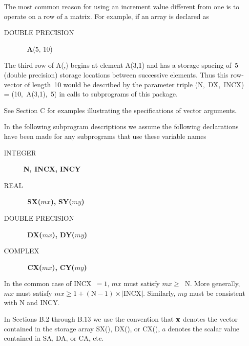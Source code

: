 \documentclass[twoside]{MATH77}
\begin{document}
The most common reason for using an increment value different from one is to
operate on a row of a matrix. For example, if an array is declared as
\begin{description}
\item[DOUBLE PRECISION]  \ {\bf A}(5, 10)
\end{description}
The third row of A(,) begins at element A(3,1) and has a storage spacing of~5
(double precision) storage locations between successive elements. Thus this
row-vector of length~10 would be described by the parameter triple
(N,~DX,~INCX) = (10,~A(3,1),~5) in calls to subprograms of this package.

See Section C for examples illustrating the specifications of vector
arguments.

In the following subprogram descriptions we assume the following
declarations have been made for any subprograms that use these variable names
\begin{description}
\item[INTEGER]  {\bf N, INCX, INCY }

\item[REAL]  {\bf \ SX($mx$), SY($my$) }

\item[DOUBLE PRECISION]  {\bf \ DX($mx$), DY($my$) }

\item[COMPLEX]  {\bf \ CX($mx$), CY($my$) }
\end{description}
In the common case of INCX\ $= 1$, $mx$ must satisfy $mx \geq\ $ N. More
generally, $mx$ must satisfy $mx \geq 1+(\text{N}-1)\times |\text{INCX}|$.
Similarly, $my$ must be consistent with N and INCY.

In Sections B.2 through B.13 we use the convention that ${\bf x}$ denotes
the vector contained in the storage array SX(), DX(), or CX(), $a$ denotes the
scalar value contained in SA, DA, or CA, etc.
\end{document}
